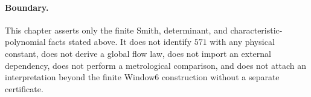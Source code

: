 \paragraph{Boundary.}
This chapter asserts only the finite Smith, determinant, and characteristic-polynomial facts stated above. It does not identify $571$ with any physical constant, does not derive a global flow law, does not import an external dependency, does not perform a metrological comparison, and does not attach an interpretation beyond the finite Window6 construction without a separate certificate.